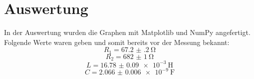 \section{Auswertung}
\label{sec:Auswertung}
In der Auswertung wurden die Graphen mit Matplotlib \cite{matplotlib} und NumPy \cite{numpy} angefertigt.\\


Folgende Werte waren geben und somit bereits vor der Messung bekannt:
\begin{displaymath}
R_1 = \SI{67.2(2)}{\ohm}
\end{displaymath}
\begin{displaymath}
R_2 = \SI{682(1)}{\ohm}
\end{displaymath}
\begin{displaymath}
L = \SI{16.78(9)e-3}{\henry}
\end{displaymath}
\begin{displaymath}
C = \SI{2.066(6)e-9}{\farad}
\end{displaymath}

